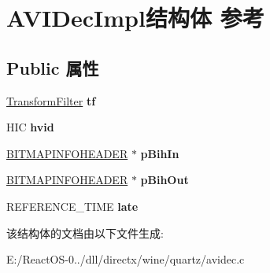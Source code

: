 \hypertarget{struct_a_v_i_dec_impl}{}\section{A\+V\+I\+Dec\+Impl结构体 参考}
\label{struct_a_v_i_dec_impl}
\subsection*{Public 属性}
\begin{DoxyCompactItemize}
\item 
\mbox{\label{struct_a_v_i_dec_impl_a011f3445a326bd20fa564b9a94b7a9d3}} 
\hyperlink{struct_transform_filter}{Transform\+Filter} {\bfseries tf}
\item 
\mbox{\label{struct_a_v_i_dec_impl_af211e36df74ffcc257f90fd7df7a7b9e}} 
H\+IC {\bfseries hvid}
\item 
\mbox{\label{struct_a_v_i_dec_impl_af9486f4121b4eebbe9f982ec87e71f21}} 
\hyperlink{struct_b_i_t_m_a_p_i_n_f_o_h_e_a_d_e_r}{B\+I\+T\+M\+A\+P\+I\+N\+F\+O\+H\+E\+A\+D\+ER} $\ast$ {\bfseries p\+Bih\+In}
\item 
\mbox{\label{struct_a_v_i_dec_impl_af9edd3f77a6abb8ad4d18c48a572b616}} 
\hyperlink{struct_b_i_t_m_a_p_i_n_f_o_h_e_a_d_e_r}{B\+I\+T\+M\+A\+P\+I\+N\+F\+O\+H\+E\+A\+D\+ER} $\ast$ {\bfseries p\+Bih\+Out}
\item 
\mbox{\label{struct_a_v_i_dec_impl_a5a376e84949f8b651ec2d306540d684a}} 
R\+E\+F\+E\+R\+E\+N\+C\+E\+\_\+\+T\+I\+ME {\bfseries late}
\end{DoxyCompactItemize}


该结构体的文档由以下文件生成\+:\begin{DoxyCompactItemize}
\item 
E\+:/\+React\+O\+S-\/0../dll/directx/wine/quartz/avidec.\+c\end{DoxyCompactItemize}

